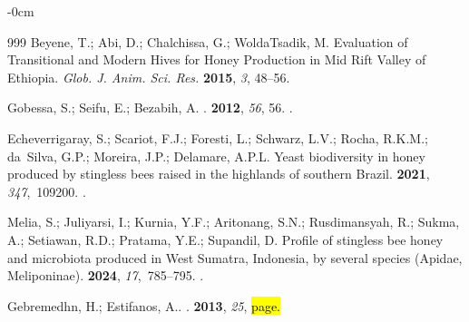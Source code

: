 \documentclass[foods,review,accept,pdftex,moreauthors]{Definitions/mdpi}
\begin{document}
{\begin{adjustwidth}{-\extralength}{0cm}
\begin{thebibliography}{999}
Beyene, T.; Abi, D.; Chalchissa, G.; WoldaTsadik, M.
\newblock Evaluation of Transitional and Modern Hives for Honey Production in
  Mid Rift Valley of Ethiopia. \emph{Glob. J. Anim. Sci. Res.}   \textbf{2015}, \emph{3}, 48--56.

Gobessa, S.;  Seifu, E.;  Bezabih, A.
.
 {\bf 2012}, \emph{56}, 56.
.

Echeverrigaray, S.; Scariot, F.J.; Foresti, L.; Schwarz, L.V.; Rocha, R.K.M.;
  da~Silva, G.P.; Moreira, J.P.; Delamare, A.P.L.
\newblock Yeast biodiversity in honey produced by stingless bees raised in the
  highlands of southern {Brazil}.
 {\bf 2021}, {\em
  347},~109200.
.

Melia, S.; Juliyarsi, I.; Kurnia, Y.F.; Aritonang, S.N.; Rusdimansyah, R.;
  Sukma, A.; Setiawan, R.D.; Pratama, Y.E.; Supandil, D.
\newblock Profile of stingless bee honey and microbiota produced in {West
  Sumatra}, {Indonesia}, by several species ({Apidae, Meliponinae}).
 {\bf 2024}, {\em 17},~785--795.
.

Gebremedhn, H.;  Estifanos, A..
.
 {\bf 2013}, {\em 25}, \hl{page.} %


\end{thebibliography}
\end{adjustwidth}}
\end{document}
